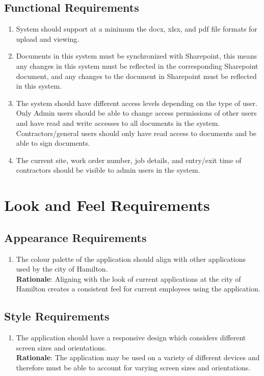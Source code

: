 \documentclass[12pt]{article}
\begin{document}
\subsection{Functional Requirements}
\begin{enumerate} [{FR}1.]
  \item System should support at a minimum the docx, xlsx, and pdf file formats for
        upload and viewing.
  \item Documents in this system must be synchronized with Sharepoint, this means any
        changes in this system must be reflected in the corresponding Sharepoint
        document, and any changes to the document in Sharepoint must be reflected in
        this system.
  \item The system should have different access levels depending on the type of user.
        Only Admin users should be able to change access permissions of other users and
        have read and write accesses to all documents in the system.
        Contractors/general users should only have read access to documents and be able
        to sign documents.
  \item The current site, work order number, job details, and entry/exit time of 
        contractors should be visible to admin users in the system.
\end{enumerate}

\section{Look and Feel Requirements}
\subsection{Appearance Requirements}
\begin{enumerate}[{LF-AP}1.]
  \item The colour palette of the application should align with other applications
  used by the city of Hamilton. \\
  \textbf{Rationale}: Aligning with the look of current applications at the city
  of Hamilton creates a consistent feel for current employees using the application.
\end{enumerate}
\subsection{Style Requirements}
\begin{enumerate}[{LF-ST}1.]
  \item The application should have a responsive design which considers different
  screen sizes and orientations. \\
  \textbf{Rationale}: The application may be used on a variety of different devices
  and therefore must be able to account for varying screen sizes and orientations.
\end{enumerate}
\end{document}
